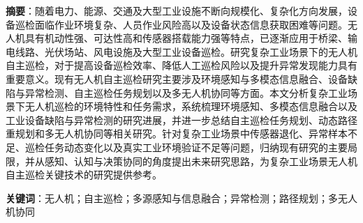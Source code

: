 
\vspace{1\linewidth}
\begin{cabstract}
\textbf{摘要}：随着电力、能源、交通及大型工业设施不断向规模化、复杂化方向发展，设备巡检面临作业环境复杂、人员作业风险高以及设备状态信息获取困难等问题。无人机具有机动性强、可达性高和传感器搭载能力强等特点，已逐渐应用于桥梁、输电线路、光伏场站、风电设施及大型工业设备巡检。研究复杂工业场景下的无人机自主巡检，对于提高设备巡检效率、降低人工巡检风险以及提升异常发现能力具有重要意义。现有无人机自主巡检研究主要涉及环境感知与多模态信息融合、设备缺陷与异常检测、自主巡检任务规划以及多无人机协同等方面。本文分析复杂工业场景下无人机巡检的环境特性和任务需求，系统梳理环境感知、多模态信息融合以及工业设备缺陷与异常检测的研究进展，并进一步总结自主巡检任务规划、动态路径重规划和多无人机协同等相关研究。针对复杂工业场景中传感器退化、异常样本不足、巡检任务动态变化以及真实工业环境验证不足等问题，归纳现有研究的主要局限，并从感知、认知与决策协同的角度提出未来研究思路，为复杂工业场景无人机自主巡检关键技术的研究提供参考。



\textbf{关键词}：无人机；自主巡检；多源感知与信息融合；异常检测；路径规划；多无人机协同
\end{cabstract}

